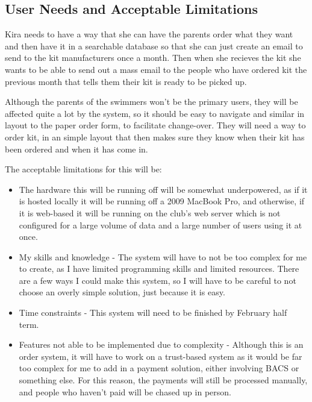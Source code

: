 \documentclass[
11pt, %
a4paper, %
oneside, %
headinclude,footinclude, %
BCOR5mm, %
]{scrartcl}
\begin{document}
\subsection{User Needs and Acceptable Limitations}
 Kira needs to have a way that she can have the parents order what they want and then have it in a searchable database so that she can just create an email to send to the kit manufacturers once a month. Then when she recieves the kit she wants to be able to send out a mass email to the people who have ordered kit the previous month that tells them their kit is ready to be picked up. 
 \par Although the parents of the swimmers won't be the primary users, they will be affected quite a lot by the system, so it should be easy to navigate and similar in layout to the paper order form, to facilitate change-over. They will need a way to order kit, in an simple layout that then makes sure they know when their kit has been ordered and when it has come in.
 \par The acceptable limitations for this will be:\begin{itemize}
 	\item The hardware this will be running off will be somewhat underpowered, as if it is hosted locally it will be running off a 2009 MacBook Pro, and otherwise, if it is web-based it will be running on the club's web server which is not configured for a large volume of data and a large number of users using it at once.
 	\item My skills and knowledge - The system will have to not be too complex for me to create, as I have limited programming skills and limited resources. There are a few ways I could make this system, so I will have to be careful to not choose an overly simple solution, just because it is easy.
 	\item Time constraints - This system will need to be finished by February half term.
 	\item Features not able to be implemented due to complexity - Although this is an order system, it will have to work on a trust-based system as it would be far too complex for me to add in a payment solution, either involving BACS or something else. For this reason, the payments will still be processed manually, and people who haven't paid will be chased up in person. 
 	
 \end{itemize}
\end{document}
